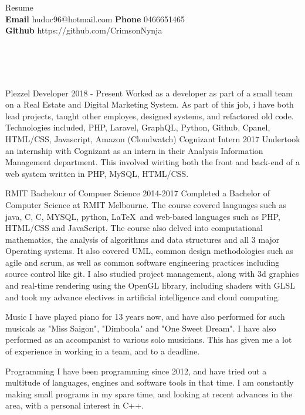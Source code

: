 \documentclass[9pt]{developercv}
\newcommand{\CC}{C\nolinebreak\hspace{-.05em}\raisebox{.4ex}{\tiny\bf +}\nolinebreak\hspace{-.10em}\raisebox{.4ex}{\tiny\bf +}}
\def\CC{{C\nolinebreak[4]\hspace{-.05em}\raisebox{.4ex}{\tiny\bf ++}}}
\begin{document}
	\begin{minipage}[a]{1.0\textwidth}
		\begin{center}
			{\HUGE Resume}\\ 
			\textbf {Email} hudoc96@hotmail.com
			\textbf {Phone} 0466651465 \\
			\textbf {Github} https://github.com/CrimsonNynja \\
		\end{center}
	\end{minipage}
	\\
	\\
	\\
	\begin{minipage}[t]{0.6\textwidth}
		\begin{entrylist}
			\entry
				{Plezzel}
				{Developer}
				{2018 - Present}
				{Worked as a developer as part of a small team on a Real Estate and Digital Marketing System. As part of this job, i have both lead projects, taught other employes, designed systems, and refactored old code. Technologies included, PHP, Laravel, GraphQL, Python, Github, Cpanel, HTML/CSS, Javascript, Amazon (Cloudwatch)}
			\entry
				{Cognizant}
				{Intern}
				{2017}
				{Undertook an internship with Cognizant as an intern in their Analysis Information Management department. This involved wiriting both the front and back-end of a web system written in PHP, MySQL, HTML/CSS.}
		\end{entrylist}	
		\cvsect{Education}
		\begin{entrylist}
			\entry
				{RMIT}
				{Bachelour of Compuer Science}
				{2014-2017}
				{Completed a Bachelor of Computer Science at RMIT Melbourne. The course covered languages such as java, C, \CC, MYSQL, python, \LaTeX  \  and web-based languages such as PHP, HTML/CSS and JavaScript. The course also delved into computational mathematics, the analysis of algorithms and data structures and all 3 major Operating systems. It also covered UML, common design methodologies such as agile and scrum, as well as common software engineering practices including source control like git. I also studied project management, along with 3d graphics and real-time rendering using the OpenGL library, including shaders with GLSL and took my advance electives in artificial intelligence and cloud computing.}
		\end{entrylist}
		\cvsect{Hobbies}
		\begin{entrylist}
			\entry
				{\vphantom{1.0}}
				{Music}
				{}
				{I have played piano for 13 years now, and have also performed for such musicals as "Miss Saigon", "Dimboola" and "One Sweet Dream". I have also performed as an accompanist to various solo musicians. This has given me a lot of experience in working in a team, and to a deadline.}
		\end{entrylist}
		\begin{entrylist}
			\entry
				{\vphantom{1.0}}
				{Programming}
				{}
				{I have been programming since 2012, and have tried out a multitude of languages, engines and software tools in that time. I am constantly making small programs in my spare time, and looking at recent advances in the area, with a personal interest in C++.}
		\end{entrylist}
	\end{minipage}
\end{document}
